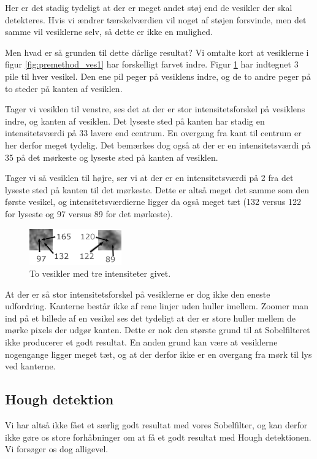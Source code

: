 Her er det stadig tydeligt at der er meget andet støj end de vesikler der skal detekteres. Hvis vi ændrer tærskelværdien vil noget af støjen forsvinde, men det samme vil vesiklerne selv, så dette er ikke en mulighed.

Men hvad er så grunden til dette dårlige resultat? Vi omtalte kort at vesiklerne i figur \ref{fig:premethod_ves1} har forskelligt farvet indre. Figur \ref{fig:premethod_vescolors} har indtegnet 3 pile til hver vesikel. Den ene pil peger på vesiklens indre, og de to andre peger på to steder på kanten af vesiklen. 

Tager vi vesiklen til venstre, ses det at der er stor intensitetsforskel på vesiklens indre, og kanten af vesiklen. Det lyseste sted på kanten har stadig en intensitetsværdi på 33 lavere end centrum. En overgang fra kant til centrum er her derfor meget tydelig. Det bemærkes dog også at der er en intensitetsværdi på 35 på det mørkeste og lyseste sted på kanten af vesiklen. 

Tager vi så vesiklen til højre, ser vi at der er en intensitetsværdi på 2 fra det lyseste sted på kanten til det mørkeste. Dette er altså meget det samme som den første vesikel, og intensitetsværdierne ligger da også meget tæt (132 versus 122 for lyseste og 97  versus 89 for det mørkeste). 

\begin{figure}[H]
	\centering
	\includegraphics[scale=5]{files/premethod/img/ves_colors.png}
	\caption{To vesikler med tre intensiteter givet.\label{fig:premethod_vescolors}}
\end{figure}

At der er så stor intensitetsforskel på vesiklerne er dog ikke den eneste udfordring. Kanterne består ikke af rene linjer uden huller imellem. Zoomer man ind på et billede af en vesikel ses det tydeligt at der er store huller mellem de mørke pixels der udgør kanten. Dette er nok den største grund til at Sobelfilteret ikke producerer et godt resultat. En anden grund kan være at vesiklerne nogengange ligger meget tæt, og at der derfor ikke er en overgang fra mørk til lys ved kanterne.

\subsection{Hough detektion}\label{premethod_hough}
Vi har altså ikke fået et særlig godt resultat med vores Sobelfilter, og kan derfor ikke gøre os store forhåbninger om at få et godt resultat med Hough detektionen. Vi forsøger os dog alligevel. 

